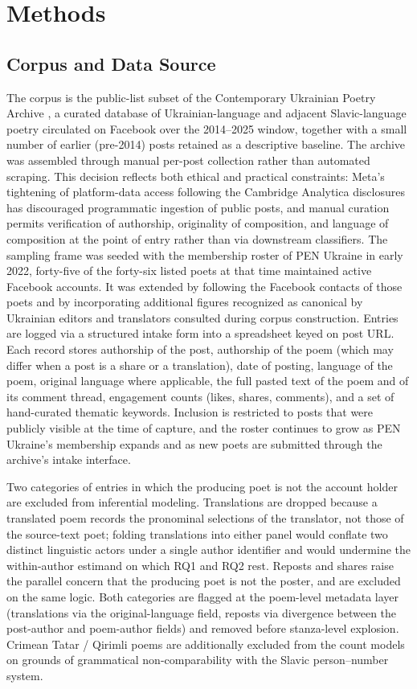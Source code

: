 \documentclass[12pt]{interact}
\theoremstyle{plain}%
\theoremstyle{definition}
\theoremstyle{remark}
\begin{document}
\section{Methods}
\label{sec:methods}

\subsection{Corpus and Data Source}

The corpus is the public-list subset of the Contemporary Ukrainian Poetry Archive \citep{glaser2024archive}, a curated database of Ukrainian-language and adjacent Slavic-language poetry circulated on Facebook over the 2014--2025 window, together with a small number of earlier (pre-2014) posts retained as a descriptive baseline. The archive was assembled through manual per-post collection rather than automated scraping. This decision reflects both ethical and practical constraints: Meta's tightening of platform-data access following the Cambridge Analytica disclosures has discouraged programmatic ingestion of public posts, and manual curation permits verification of authorship, originality of composition, and language of composition at the point of entry rather than via downstream classifiers. The sampling frame was seeded with the membership roster of PEN Ukraine in early 2022,  forty-five of the forty-six listed poets at that time maintained active Facebook accounts. It was extended by following the Facebook contacts of those poets and by incorporating additional figures recognized as canonical by Ukrainian editors and translators consulted during corpus construction. Entries are logged via a structured intake form into a spreadsheet keyed on post URL. Each record stores authorship of the post, authorship of the poem (which may differ when a post is a share or a translation), date of posting, language of the poem, original language where applicable, the full pasted text of the poem and of its comment thread, engagement counts (likes, shares, comments), and a set of hand-curated thematic keywords. Inclusion is restricted to posts that were publicly visible at the time of capture, and the roster continues to grow as PEN Ukraine's membership expands and as new poets are submitted through the archive's intake interface.

Two categories of entries in which the producing poet is not the account holder are excluded from inferential modeling. Translations are dropped because a translated poem records the pronominal selections of the translator, not those of the source-text poet; folding translations into either panel would conflate two distinct linguistic actors under a single author identifier and would undermine the within-author estimand on which RQ1 and RQ2 rest. Reposts and shares raise the parallel concern that the producing poet is not the poster, and are excluded on the same logic. Both categories are flagged at the poem-level metadata layer (translations via the original-language field, reposts via divergence between the post-author and poem-author fields) and removed before stanza-level explosion. Crimean Tatar / Qirimli poems are additionally excluded from the count models on grounds of grammatical non-comparability with the Slavic person--number system.
\end{document}
